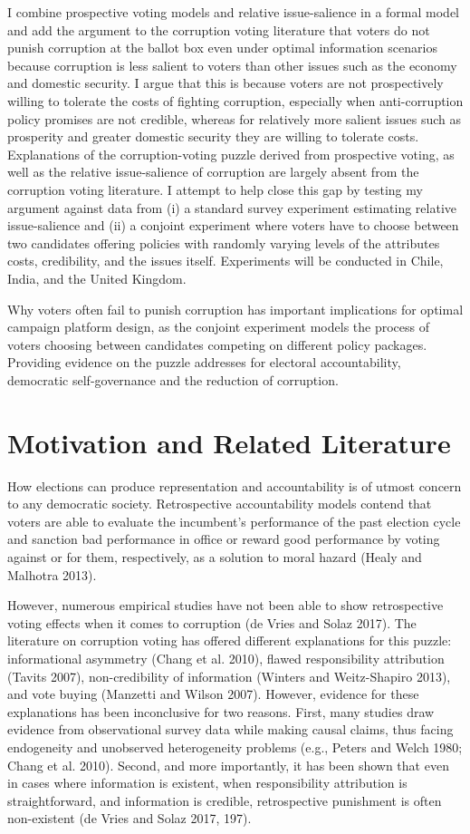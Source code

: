 \documentclass[11pt]{article}
\begin{document}
I combine prospective voting models and relative issue-salience in a formal model and add the argument to the corruption voting literature that voters do not punish corruption at the ballot box even under optimal information scenarios because corruption is less salient to voters than other issues such as the economy and domestic security. I argue that this is because voters are not prospectively willing to tolerate the costs of fighting corruption, especially when anti-corruption policy promises are not credible, whereas for relatively more salient issues such as prosperity and greater domestic security they are willing to tolerate costs. Explanations of the corruption-voting puzzle derived from prospective voting, as well as the relative issue-salience of corruption are largely absent from the corruption voting literature. I attempt to help close this gap by testing my argument against data from (i) a standard survey experiment estimating relative issue-salience and (ii) a conjoint experiment where voters have to choose between two candidates offering policies with randomly varying levels of the attributes costs, credibility, and the issues itself. Experiments will be conducted in Chile, India, and the United Kingdom.

Why voters often fail to punish corruption has important implications for optimal campaign platform design, as the conjoint experiment models the process of voters choosing between candidates competing on different policy packages. Providing evidence on the puzzle addresses for electoral accountability, democratic self-governance and the reduction of corruption.

\newpage
\section{Motivation and Related Literature}
How elections can produce representation and accountability is of utmost concern to any democratic society. Retrospective accountability models contend that voters are able to evaluate the incumbent's performance of the past election cycle and sanction bad performance in office or reward good performance by voting against or for them, respectively, as a solution to moral hazard (Healy and Malhotra 2013).

However, numerous empirical studies have not been able to show retrospective voting effects when it comes to corruption (de Vries and Solaz 2017). The literature on corruption voting has offered different explanations for this puzzle: informational asymmetry (Chang et al. 2010), flawed responsibility attribution (Tavits 2007), non-credibility of information (Winters and Weitz-Shapiro 2013), and vote buying (Manzetti and Wilson 2007). However, evidence for these explanations has been inconclusive for two reasons. First, many studies draw evidence from observational survey data while making causal claims, thus facing endogeneity and unobserved heterogeneity problems (e.g., Peters and Welch 1980; Chang et al. 2010). Second, and more importantly, it has been shown that even in cases where information is existent, when responsibility attribution is straightforward, and information is credible, retrospective punishment is often non-existent (de Vries and Solaz 2017, 197).
\end{document}
